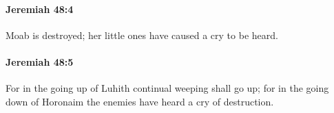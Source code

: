 		\paragraph{Jeremiah 48:4} %
			\label{JEREMIAH-48-4}

			Moab is destroyed; her little ones have caused a cry to be heard.


		\paragraph{Jeremiah 48:5} %
			\label{JEREMIAH-48-5}

			For in the going up of Luhith continual weeping shall go up; for in the going down of Horonaim the enemies have heard a cry of destruction.



